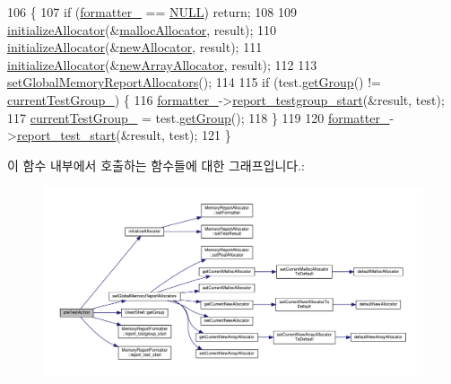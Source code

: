 \begin{DoxyCode}
106 \{
107     \textcolor{keywordflow}{if} (\hyperlink{class_memory_reporter_plugin_a09aec3af9ca6c3c27226a1aaaea13987}{formatter\_} == \hyperlink{openavb__types__base__pub_8h_a070d2ce7b6bb7e5c05602aa8c308d0c4}{NULL}) \textcolor{keywordflow}{return};
108 
109     \hyperlink{class_memory_reporter_plugin_a4fb1e05cb45f4311847a1275fc20188f}{initializeAllocator}(&\hyperlink{class_memory_reporter_plugin_aa49eebf4ef7d746fe9b0bd9d4f531a26}{mallocAllocator}, result);
110     \hyperlink{class_memory_reporter_plugin_a4fb1e05cb45f4311847a1275fc20188f}{initializeAllocator}(&\hyperlink{class_memory_reporter_plugin_a16c3ef79a69a69085afcf09a45204886}{newAllocator}, result);
111     \hyperlink{class_memory_reporter_plugin_a4fb1e05cb45f4311847a1275fc20188f}{initializeAllocator}(&\hyperlink{class_memory_reporter_plugin_a3d542a63f3f729d8721651311e8a7eae}{newArrayAllocator}, result);
112 
113     \hyperlink{class_memory_reporter_plugin_ad370cc906e33aa1c0d154a801821f0e3}{setGlobalMemoryReportAllocators}();
114 
115     \textcolor{keywordflow}{if} (test.\hyperlink{class_utest_shell_a9d203c5f3c7cb6d28b66189a20735dca}{getGroup}() != \hyperlink{class_memory_reporter_plugin_a4733051c1386e53d8d11c6b35922dbc7}{currentTestGroup\_}) \{
116         \hyperlink{class_memory_reporter_plugin_a09aec3af9ca6c3c27226a1aaaea13987}{formatter\_}->\hyperlink{class_memory_report_formatter_a8f75294451f71b616932a7a9c649caa0}{report\_testgroup\_start}(&result, test);
117         \hyperlink{class_memory_reporter_plugin_a4733051c1386e53d8d11c6b35922dbc7}{currentTestGroup\_} = test.\hyperlink{class_utest_shell_a9d203c5f3c7cb6d28b66189a20735dca}{getGroup}();
118     \}
119 
120     \hyperlink{class_memory_reporter_plugin_a09aec3af9ca6c3c27226a1aaaea13987}{formatter\_}->\hyperlink{class_memory_report_formatter_a3e3c7a63454b6711cf890eddcaba0d6a}{report\_test\_start}(&result, test);
121 \}
\end{DoxyCode}


이 함수 내부에서 호출하는 함수들에 대한 그래프입니다.\+:
\nopagebreak
\begin{figure}[H]
\begin{center}
\leavevmode
\includegraphics[width=350pt]{class_memory_reporter_plugin_af405f9e83b5fbe382893b8dc07a8052c_cgraph}
\end{center}
\end{figure}




